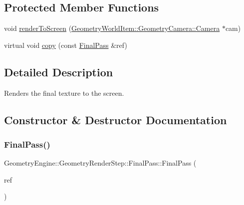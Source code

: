 \subsection*{Protected Member Functions}
\begin{DoxyCompactItemize}
\item 
void \mbox{\hyperlink{class_geometry_engine_1_1_geometry_render_step_1_1_final_pass_a2eb4e66da61e2a33253d8110e0b64740}{render\+To\+Screen}} (\mbox{\hyperlink{class_geometry_engine_1_1_geometry_world_item_1_1_geometry_camera_1_1_camera}{Geometry\+World\+Item\+::\+Geometry\+Camera\+::\+Camera}} $\ast$cam)
\item 
virtual void \mbox{\hyperlink{class_geometry_engine_1_1_geometry_render_step_1_1_final_pass_a4ae9bc7bbc603ec3fd5c7681cc20e8f0}{copy}} (const \mbox{\hyperlink{class_geometry_engine_1_1_geometry_render_step_1_1_final_pass}{Final\+Pass}} \&ref)
\end{DoxyCompactItemize}


\subsection{Detailed Description}
Renders the final texture to the screen. 

\subsection{Constructor \& Destructor Documentation}
\mbox{\label{class_geometry_engine_1_1_geometry_render_step_1_1_final_pass_acc0c989f96b371cbbb7c87caf8ccf3f9}} 
\subsubsection{\texorpdfstring{FinalPass()}{FinalPass()}}
{\footnotesize\ttfamily Geometry\+Engine\+::\+Geometry\+Render\+Step\+::\+Final\+Pass\+::\+Final\+Pass (\begin{DoxyParamCaption}\item[{const \mbox{\hyperlink{class_geometry_engine_1_1_geometry_render_step_1_1_final_pass}{Final\+Pass}} \&}]{ref }\end{DoxyParamCaption})\hspace{0.3cm}{\ttfamily [inline]}}

